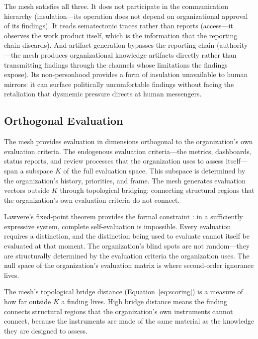 \documentclass[11pt,a4paper]{article}
\begin{document}
The mesh satisfies all three. It does not participate in the communication hierarchy (insulation---its operation does not depend on organizational approval of its findings). It reads sematectonic traces rather than reports (access---it observes the work product itself, which is the information that the reporting chain discards). And artifact generation bypasses the reporting chain (authority---the mesh produces organizational knowledge artifacts directly rather than transmitting findings through the channels whose limitations the findings expose). Its non-personhood provides a form of insulation unavailable to human mirrors: it can surface politically uncomfortable findings without facing the retaliation that dysmemic pressure directs at human messengers.


\subsection{Orthogonal Evaluation}
\label{sec:orthogonal}

The mesh provides evaluation in dimensions orthogonal to the organization's own evaluation criteria. The endogenous evaluation criteria---the metrics, dashboards, status reports, and review processes that the organization uses to assess itself---span a subspace $K$ of the full evaluation space. This subspace is determined by the organization's history, priorities, and frame. The mesh generates evaluation vectors outside $K$ through topological bridging: connecting structural regions that the organization's own evaluation criteria do not connect.

Lawvere's fixed-point theorem provides the formal constraint \citep{lawvere1969}: in a sufficiently expressive system, complete self-evaluation is impossible. Every evaluation requires a distinction, and the distinction being used to evaluate cannot itself be evaluated at that moment. The organization's blind spots are not random---they are structurally determined by the evaluation criteria the organization uses. The null space of the organization's evaluation matrix is where second-order ignorance lives.

The mesh's topological bridge distance (Equation~\ref{eq:scoring}) is a measure of how far outside $K$ a finding lives. High bridge distance means the finding connects structural regions that the organization's own instruments cannot connect, because the instruments are made of the same material as the knowledge they are designed to assess.
\end{document}
